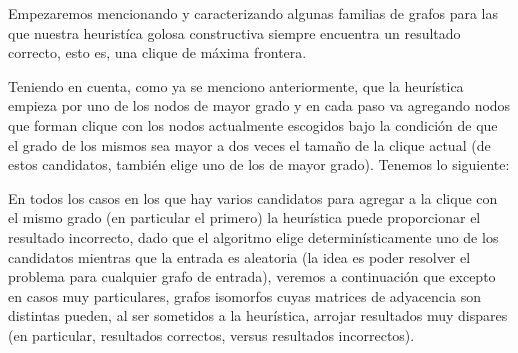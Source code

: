 Empezaremos mencionando y caracterizando algunas familias de grafos
para las que nuestra heurist\'ica golosa constructiva siempre encuentra
un resultado correcto, esto es, una clique de m\'axima frontera.

Teniendo en cuenta, como ya se menciono anteriormente, que la heur\'istica
empieza por uno de los nodos de mayor grado y en cada paso va 
agregando nodos que forman clique con los nodos actualmente escogidos
bajo la condici\'on de que el grado de los mismos sea mayor a dos veces
el tama\~no de la clique actual (de estos candidatos, tambi\'en elige
uno de los de mayor grado). Tenemos lo siguiente:

En todos los casos en los que hay varios candidatos para agregar a la
clique con el mismo grado (en particular el primero) la heur\'istica
puede proporcionar el resultado incorrecto, dado que el algoritmo
elige determin\'isticamente uno de los candidatos mientras que la 
entrada es aleatoria (la idea es poder resolver el problema para
cualquier grafo de entrada), veremos a continuaci\'on que excepto
en casos muy particulares, grafos isomorfos cuyas matrices de adyacencia
son distintas pueden, al ser sometidos a la heur\'istica, arrojar
resultados muy dispares (en particular, resultados correctos, versus
resultados incorrectos).

